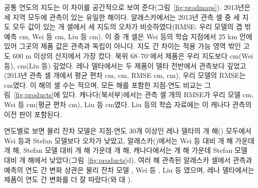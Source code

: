 공통 연도의 지도는 이 차이를 공간적으로 보여 준다(그림~\ref{fig:prodmaps}). 2013년은 세 지역 모두에 관측이 있는 유일한 해이다. 알래스카에서는 2013년 관측 셀 중 세 지도 모두 값이 있는 \nfeAkN{}개 셀에서 세 지도의 오차가 비슷하였다(RMSE: 우리 모델의 겹 밖 예측 \nfeAkOof{} cm, Wei 등 \nfeAkWei{} cm, Liu 등 \nfeAkLiu{} cm). 이 중 \nfeAkNearWei{}개 셀은 Wei 등의 학습 지점에서 25 km 안에 있어 그곳의 제품 값은 관측과 독립이 아니다. 지도 간 차이는 적용 가능 영역 밖인 고도 600 m 이상의 산지에서 가장 컸다. 북위 68--70$^\circ$에서 제품은 우리 지도보다 \nmapAkFootMtnWei{} cm(Wei 등), \nmapAkFootMtnLiu{} cm(Liu 등) 깊었다. 레나 델타에서는 두 제품이 델타 전반에서 관측보다 깊었고(2013년 관측 셀 \nfeLeN{}개에서 평균 편차 \nfeLeBiasWei{} cm, \nfeLeBiasLiu{} cm, RMSE \nfeLeWei{} cm, \nfeLeLiu{} cm), 우리 모델의 RMSE는 \nfeLeOof{} cm였다. 이 해의 셀 수는 적으며, 모든 해를 포함한 지점-연도 비교는 그림~\ref{fig:products}에 있다. 캐나다(북서부)에서는 관측 셀 \nfeCaN{}개의 RMSE가 우리 모델 \nfeCaOof{} cm, Wei 등 \nfeCaWei{} cm(평균 편차 \nfeCaBiasWei{} cm), Liu 등 \nfeCaLiu{} cm였다. Liu 등의 학습 자료에는 이 캐나다 관측의 이전 판이 포함된다.


연도별로 보면 물리 잔차 모델은 지점-연도 30개 이상인 레나 델타의 \nywLen{}개 해(\nyrsywLeko) 모두에서 Wei 등과 Stefan 모델보다 오차가 낮았고, 알래스카(\nyrsywAkko)에서는 Wei 등 대비 \nywAkRoWein{}개 해 가운데 \nywAkRoWeiwin{}개 해, Stefan 모델 대비 \nywAkRoPon{}개 해 가운데 \nywAkRoPowin{}개 해, 캐나다에서는 \nywCaRoPon{}개 해 가운데 Stefan 모델 대비 \nywCaRoPowin{}개 해에서 낮았다(그림~\ref{fig:products}d). 여러 해 관측된 알래스카 셀에서 관측과 예측의 연도 간 변화 상관은 물리 잔차 모델 \nrdeltaAkRo, Wei 등 \nrdeltaAkWei, Liu 등 \nrdeltaAkLiu{}였으며, 레나 델타에서는 제품이 연도 간 변화를 더 잘 따랐다(\nrdeltaLeWei{}와 \nrdeltaLeLiu{} 대 \nrdeltaLeRo).


